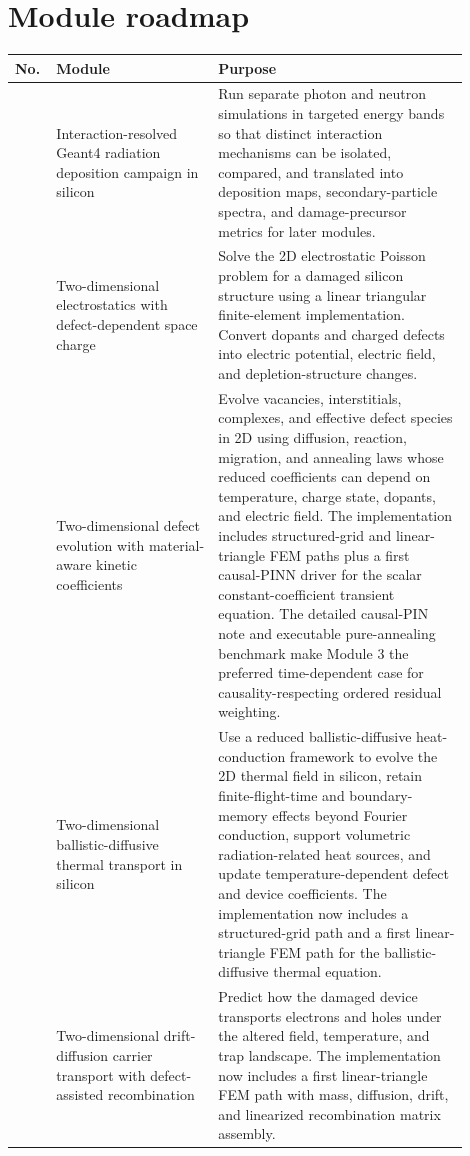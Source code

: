\documentclass[11pt]{article}
\begin{document}
\section{Module roadmap}
{\small
\renewcommand{\arraystretch}{1.08}
\begin{longtable}{>{\RaggedRight\arraybackslash}p{0.06\linewidth} >{\RaggedRight\arraybackslash}p{0.33\linewidth} >{\RaggedRight\arraybackslash}p{0.51\linewidth}}
\toprule
\textbf{No.} & \textbf{Module} & \textbf{Purpose}\\
\midrule
1 & Interaction-resolved Geant4 radiation deposition campaign in silicon & Run separate photon and neutron simulations in targeted energy bands so that distinct interaction mechanisms can be isolated, compared, and translated into deposition maps, secondary-particle spectra, and damage-precursor metrics for later modules.\\
2 & Two-dimensional electrostatics with defect-dependent space charge & Solve the 2D electrostatic Poisson problem for a damaged silicon structure using a linear triangular finite-element implementation. Convert dopants and charged defects into electric potential, electric field, and depletion-structure changes.\\
3 & Two-dimensional defect evolution with material-aware kinetic coefficients & Evolve vacancies, interstitials, complexes, and effective defect species in 2D using diffusion, reaction, migration, and annealing laws whose reduced coefficients can depend on temperature, charge state, dopants, and electric field. The implementation includes structured-grid and linear-triangle FEM paths plus a first causal-PINN driver for the scalar constant-coefficient transient equation. The detailed causal-PIN note and executable pure-annealing benchmark make Module 3 the preferred time-dependent case for causality-respecting ordered residual weighting.\\
4 & Two-dimensional ballistic-diffusive thermal transport in silicon & Use a reduced ballistic-diffusive heat-conduction framework to evolve the 2D thermal field in silicon, retain finite-flight-time and boundary-memory effects beyond Fourier conduction, support volumetric radiation-related heat sources, and update temperature-dependent defect and device coefficients. The implementation now includes a structured-grid path and a first linear-triangle FEM path for the ballistic-diffusive thermal equation.\\
5 & Two-dimensional drift-diffusion carrier transport with defect-assisted recombination & Predict how the damaged device transports electrons and holes under the altered field, temperature, and trap landscape. The implementation now includes a first linear-triangle FEM path with mass, diffusion, drift, and linearized recombination matrix assembly.\\

\end{longtable}}
\end{document}
